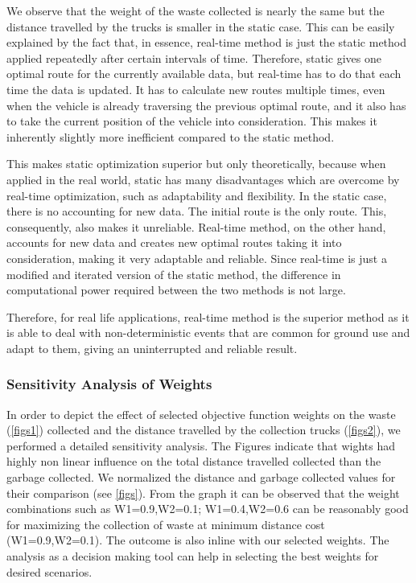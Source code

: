 \documentclass[12pt]{article}
\begin{document}
We observe that the weight of the waste collected is nearly the same but the distance travelled by the trucks is smaller in the static case. This can be easily explained by the fact that, in essence, real-time method is just the static method applied repeatedly after certain intervals of time. Therefore, static gives one optimal route for the currently available data, but real-time has to do that each time the data is updated. It has to calculate new routes multiple times, even when the vehicle is already traversing the previous optimal route, and it also has to take the current position of the vehicle into consideration. This makes it inherently slightly more inefficient compared to the static method. 

This makes static optimization superior but only theoretically, because when applied in the real world, static has many disadvantages which are overcome by real-time optimization, such as adaptability and flexibility. In the static case, there is no accounting for new data. The initial route is the only route. This, consequently, also makes it unreliable. Real-time method, on the other hand, accounts for new data and creates new optimal routes taking it into consideration, making it very adaptable and reliable. Since real-time is just a modified and iterated version of the static method, the difference in computational power required between the two methods is not large. 

Therefore, for real life applications, real-time method is the superior method as it is able to deal with non-deterministic events that are common for ground use and adapt to them, giving an uninterrupted and reliable result.


 
\subsubsection*{Sensitivity Analysis of Weights}
In order to depict the effect of selected objective function weights on the waste  (\ref{figs1})  collected and the distance travelled by the collection trucks (\ref{figs2}), we performed a detailed sensitivity analysis. The Figures indicate that wights had highly non linear influence on the total distance travelled collected than the garbage collected. We normalized the distance and garbage collected values for their comparison (see \ref{figs}). From the graph it can be observed that the weight combinations such as W1=0.9,W2=0.1; W1=0.4,W2=0.6 can be reasonably good for maximizing the collection of waste at minimum distance cost (W1=0.9,W2=0.1). The outcome is also inline with our selected weights. The analysis as a decision making tool can help  in selecting the best weights for desired scenarios.
\end{document}
